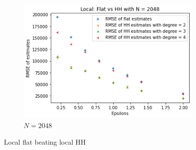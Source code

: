 \documentclass[11pt]{article}
\theoremstyle{definition}
\begin{document}
\begin{figure}[H]
\begin{subfigure}{.3\textwidth}
  \includegraphics[width=\linewidth]{figures/local_flat_hh/flat_beat_hh_N=2048.png}
  \caption{$N=2048$}
  \label{fig:loc_flat_hh3}
\end{subfigure}
\caption{Local flat beating local HH}
\label{fig:loc_flat_hh}
\end{figure}
\end{document}
